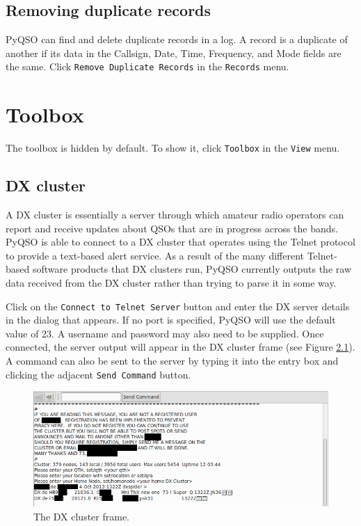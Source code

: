 \documentclass[11pt, a4paper]{report}
\begin{document}
\section{Removing duplicate records}
PyQSO can find and delete duplicate records in a log. A record is a duplicate of another if its data in the Callsign, Date, Time, Frequency, and Mode fields are the same. Click \texttt{Remove Duplicate Records} in the \texttt{Records} menu.

\chapter{Toolbox}\label{chap:toolbox}
The toolbox is hidden by default. To show it, click \texttt{Toolbox} in the \texttt{View} menu.

\section{DX cluster}
A DX cluster is essentially a server through which amateur radio operators can report and receive updates about QSOs that are in progress across the bands. PyQSO is able to connect to a DX cluster that operates using the Telnet protocol to provide a text-based alert service. As a result of the many different Telnet-based software products that DX clusters run, PyQSO currently outputs the raw data received from the DX cluster rather than trying to parse it in some way.

Click on the \texttt{Connect to Telnet Server} button and enter the DX server details in the dialog that appears. If no port is specified, PyQSO will use the default value of 23. A username and password may also need to be supplied. Once connected, the server output will appear in the DX cluster frame (see Figure \ref{fig:dx_cluster}). A command can also be sent to the server by typing it into the entry box and clicking the adjacent \texttt{Send Command} button.

\begin{figure}
  \centering
  \includegraphics[width=1\columnwidth]{images/dx_cluster.png}
  \caption{The DX cluster frame.}
  \label{fig:dx_cluster}
\end{figure}
\end{document}
